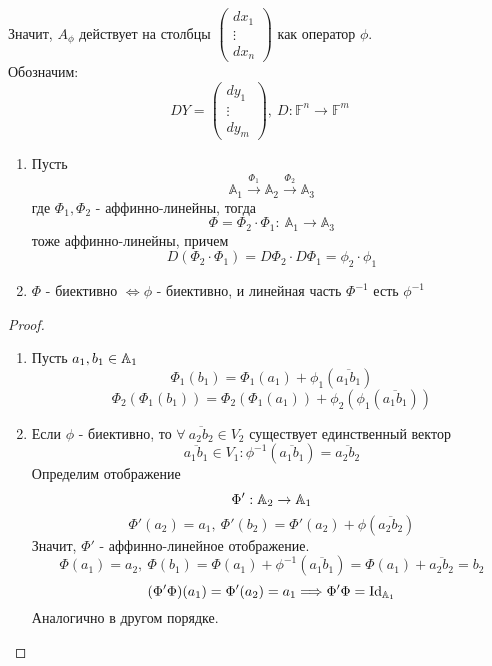 Значит, $A_{\phi}$ действует на столбцы
$\begin{pmatrix}
    dx_1\\
    \vdots\\
    dx_n
\end{pmatrix}$
как оператор $\phi$.\\
Обозначим:
\[DY=\begin{pmatrix}
    dy_1\\
    \vdots\\
    dy_m
\end{pmatrix},\
D: \mathbb{F}^n \to \mathbb{F}^m
\]
\begin{subtheorem} \tab
    \begin{enumerate}
        \item Пусть 
        \[\mathbb{A}_1 \xrightarrow{\Phi_1} \mathbb{A}_2 \xrightarrow{\Phi_2} \mathbb{A}_3\]
        где $\Phi_1,\Phi_2$ - аффинно-линейны, тогда
        \[\Phi=\Phi_2\cdot \Phi_1: \ \mathbb{A}_1\to \mathbb{A}_3\]
        тоже аффинно-линейны, причем 
        \[D(\Phi_2\cdot \Phi_1)=D\Phi_2\cdot D\Phi_1=\phi_2\cdot\phi_1\]
        \item $\Phi$ - биективно $\Longleftrightarrow \phi$ - биективно, и линейная часть $\Phi^{-1}$ есть $\phi^{-1}$
    \end{enumerate}
\end{subtheorem}
\begin{proof} \tab
    \begin{enumerate}
        \item Пусть $a_1, b_1\in \mathbb{A}_1$
        \[\Phi_1(b_1)=\Phi_1(a_1)+\phi_1(\overline{a_1b_1})\]
        \[\Phi_2(\Phi_1(b_1))=\Phi_2(\Phi_1(a_1))+\phi_2(\phi_1(\overline{a_1b_1}))\]
        \item Если $\phi$ - биективно, то $\forall\ \overline{a_2b_2}\in V_2$ существует единственный вектор
        \[\overline{a_1b_1}\in V_1: \phi^{-1}(\overline{a_1b_1})=\overline{a_2b_2}\]
        Определим отображение 
        \[\Phi': \mathbb{A}_2\to \mathbb{A}_1\]
        \[\Phi'(a_2)=a_1,\ \Phi'(b_2)=\Phi'(a_2)+\phi(\overline{a_2b_2})\]
        Значит, $\Phi'$ - аффинно-линейное отображение.
        \[\Phi(a_1)=a_2,\ \Phi(b_1)=\Phi(a_1)+\phi^{-1}(\overline{a_1b_1})=\Phi(a_1)+\overline{a_2b_2}=b_2\]
        \[(\Phi'\Phi)(a_1)=\Phi'(a_2)=a_1 \Longrightarrow \Phi'\Phi = \text{Id}_{\mathbb{A}_1}\] 
        Аналогично в другом порядке.
    \end{enumerate}
\end{proof} 
